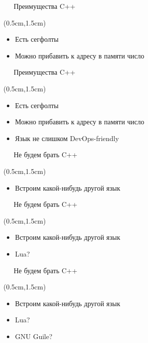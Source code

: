 \documentclass[xetex,18pt,aspectratio=43]{beamer}
\begin{document}
\begin{Large}
\begin{frame}{\ \ \ Преимущества C++}
\begin{textblock*}{\framewidth-0.8cm}(0.5cm,1.5cm)
\begin{itemize}
  \item Есть сегфолты
  \item Можно прибавить к адресу в памяти число
\end{itemize}
\end{textblock*}
\end{frame}

\begin{frame}{\ \ \ Преимущества C++}
\begin{textblock*}{\framewidth-0.8cm}(0.5cm,1.5cm)
\begin{itemize}
  \item Есть сегфолты
  \item Можно прибавить к адресу в памяти число
  \item Язык не слишком DevOps-friendly
\end{itemize}
\end{textblock*}
\end{frame}

\begin{frame}{\ \ \ Не будем брать C++}
\begin{textblock*}{\framewidth-0.8cm}(0.5cm,1.5cm)
\begin{itemize}
  \item Встроим какой-нибудь другой язык
\end{itemize}
\end{textblock*}
\end{frame}

\begin{frame}{\ \ \ Не будем брать C++}
\begin{textblock*}{\framewidth-0.8cm}(0.5cm,1.5cm)
\begin{itemize}
  \item Встроим какой-нибудь другой язык
  \item Lua?
\end{itemize}
\end{textblock*}
\end{frame}

\begin{frame}{\ \ \ Не будем брать C++}
\begin{textblock*}{\framewidth-0.8cm}(0.5cm,1.5cm)
\begin{itemize}
  \item Встроим какой-нибудь другой язык
  \item Lua?
  \item GNU Guile?
\end{itemize}
\end{textblock*}
\end{frame}


\end{Large}
\end{document}

